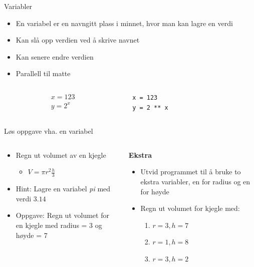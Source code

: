 \documentclass[screen, aspectratio=169]{beamer}
\begin{document}
\begin{frame}[fragile]{Variabler}
	\begin{itemize}
		\item En variabel er en navngitt plass i minnet, hvor man kan lagre en verdi
		\item Kan slå opp verdien ved å skrive navnet
		\item Kan senere endre verdien
		\item Parallell til matte
	\end{itemize}
	
	\begin{columns}
		\begin{column}{.3\textwidth}
			\begin{gather*}
				x = 123\\
				y = 2^x
			\end{gather*}
		\end{column}
		\begin{column}{.7\textwidth}
			\begin{lstlisting}
x = 123
y = 2 ** x
			\end{lstlisting}
		\end{column}
	\end{columns}
	
\end{frame}

\begin{frame}[fragile]{Løs oppgave vha. en variabel}
	\begin{columns}
		\begin{column}{.5\textwidth}
			\begin{itemize}
				\item Regn ut volumet av en kjegle
				\begin{itemize}
					\item $V=\pi r^2\frac{h}{3}$
				\end{itemize}
				\item Hint: Lagre en variabel \emph{pi} med verdi $3.14$
				\item Oppgave: Regn ut volumet for en kjegle med radius = 3 og høyde = 7
			\end{itemize}
		\end{column}
	\hspace{-20pt}\vrule\hspace{20pt}
		\begin{column}{.4\textwidth}
			{\large\bfseries Ekstra}
			\begin{itemize}
				\item Utvid programmet til å bruke to ekstra variabler, en for radius og en for høyde
				\item Regn ut volumet for kjegle med:
				\begin{enumerate}
					\item $r=3, h=7$
					\item $r=1, h=8$
					\item $r=3, h=2$
				\end{enumerate}
			\end{itemize}
		\end{column}
	\end{columns}
\end{frame}
\end{document}
